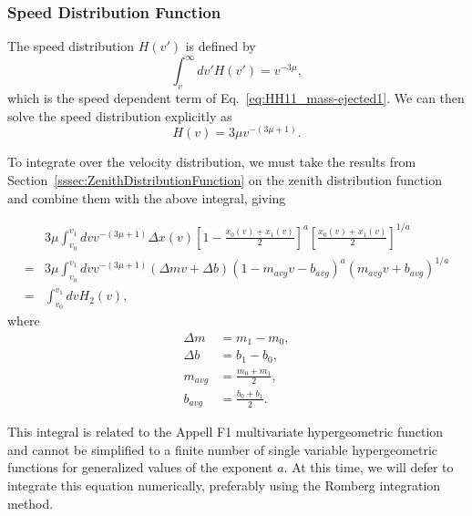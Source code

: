\documentclass{hitec}
\numberwithin{equation}{section}
\begin{document}
\subsubsection{Speed Distribution Function}

The speed distribution $H(v')$ is defined by
\begin{equation}
\int_{v}^{\infty}dv'H(v') = v^{-3\mu},
\end{equation}
which is the speed dependent term of Eq.\ \eqref{eq:HH11_mass-ejected1}. We can then solve the speed distribution explicitly as
\begin{equation}\label{eq:vel_dist}
H(v) = 3\mu v^{-(3\mu+1)}.
\end{equation}

To integrate over the velocity distribution, we must take the results from Section~\ref{sssec:ZenithDistributionFunction} on the zenith distribution function and combine them with the above integral, giving

\begin{align}
&3\mu\int_{v_0}^{v_1}dv v^{-(3\mu+1)}\Delta x(v)\left[1-\frac{x_0(v)+x_1(v)}{2}\right]^a \left[\frac{x_0(v)+x_1(v)}{2}\right]^{1/a}\\
=& 3\mu\int_{v_0}^{v_1}dv v^{-(3\mu+1)}(\Delta m v + \Delta b)(1-m_{avg}v-b_{avg})^a(m_{avg}v + b_{avg})^{1/a}\\
=& \int_{v_0}^{v_1}dv H_2(v),\label{eq:def_H2}
\end{align}
where
\begin{align}
\Delta m & = m_1 - m_0,\\
\Delta b &= b_1 - b_0,\\
m_{avg} &= \frac{m_0+m_1}{2},\\
b_{avg} &= \frac{b_0+b_1}{2}.
\end{align}

This integral is related to the Appell F1 multivariate hypergeometric function and cannot be simplified to a finite number of single variable hypergeometric functions for generalized values of the exponent $a$. At this time, we will defer to integrate this equation numerically, preferably using the Romberg integration method.
\end{document}
